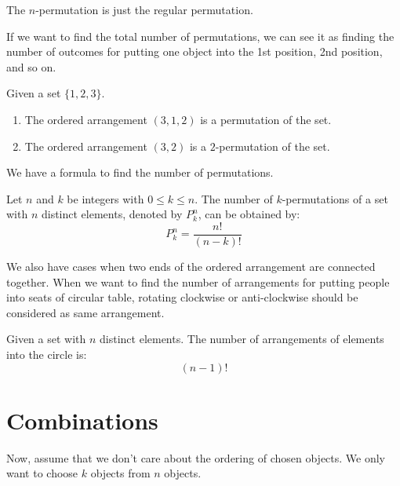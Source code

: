 \documentclass{huhtakm-template-book}
\begin{document}
\begin{rem}
	The $n$-permutation is just the regular permutation.
\end{rem}
\begin{rem}
	If we want to find the total number of permutations, we can see it as finding the number of outcomes for putting one object into the 1st position, 2nd position, and so on.
\end{rem}
\begin{eg}
	Given a set $\{1,2,3\}$.
	\begin{enumerate}
		\item The ordered arrangement $(3,1,2)$ is a permutation of the set.
		\item The ordered arrangement $(3,2)$ is a $2$-permutation of the set.
	\end{enumerate}
\end{eg}

\newpage
We have a formula to find the number of permutations.
\begin{thm}
	Let $n$ and $k$ be integers with $0\leq k\leq n$. The number of $k$-permutations of a set with $n$ distinct elements, denoted by $P_{k}^{n}$, can be obtained by:
	\begin{equation*}
		P_{k}^{n}=\frac{n!}{(n-k)!}
	\end{equation*}
\end{thm}
We also have cases when two ends of the ordered arrangement are connected together. When we want to find the number of arrangements for putting people into seats of circular table, rotating clockwise or anti-clockwise should be considered as same arrangement.
\begin{thm}
	Given a set with $n$ distinct elements. The number of arrangements of elements into the circle is:
	\begin{equation*}
		(n-1)!
	\end{equation*}
\end{thm}

\section{Combinations}
Now, assume that we don't care about the ordering of chosen objects. We only want to choose $k$ objects from $n$ objects.
\end{document}
